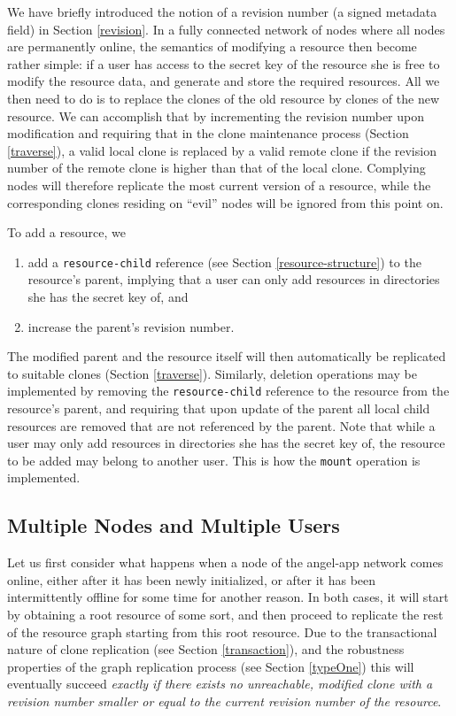 \documentclass[11pt]{article}
\begin{document}
\begin{mainmatter}
We have briefly introduced the notion of a revision number (a signed metadata field) in Section \ref{revision}. In a fully connected network of nodes where all nodes are permanently online, the semantics of modifying a resource then become rather simple: if a user has access to the secret key of the resource she is free to modify the resource data, and generate and store the required resources. All we then need to do is to replace the clones of the old resource by clones of the new resource. We can accomplish that by incrementing the revision number upon modification and requiring that in the clone maintenance process (Section \ref{traverse}), a valid local clone is replaced by a valid remote clone if the revision number of the remote clone is higher than that of the local clone. Complying nodes will therefore replicate the most current version of a resource, while the corresponding clones residing on ``evil'' nodes will be ignored from this point on.

To add a resource, we 
\begin{enumerate}
\item add a  \texttt{resource-child} reference (see Section \ref{resource-structure}) to the resource's parent, implying that a user can only add resources in directories she has the secret key of, and 
\item increase the parent's revision number.
\end{enumerate}
The modified parent and the resource itself will then automatically be replicated to suitable clones (Section \ref{traverse}). Similarly, deletion operations may be implemented by removing the \texttt{resource-child}  reference to the resource from the resource's parent, and requiring that upon update of the parent all local child resources are removed that are not referenced by the parent. Note that while a user may only add resources in directories she has the secret key of, the resource to be added may belong to another user. This is how the \texttt{mount} operation is implemented. 

\subsection{Multiple Nodes and Multiple Users}
\label{multiple}
Let us first consider what happens when a node of the angel-app network comes online, either after it has been newly initialized, or after it has been intermittently offline for some time for another reason. In both cases, it will start by obtaining a root resource of some sort, and then proceed to replicate the rest of the resource graph starting from this root resource. Due to the transactional nature of clone replication (see Section \ref{transaction}), and the robustness properties of the graph replication process (see Section \ref{typeOne}) this will eventually succeed \emph{exactly if there exists no unreachable, modified clone  with a revision number smaller or equal to the current revision number of the resource}.


\end{mainmatter}
\end{document}
